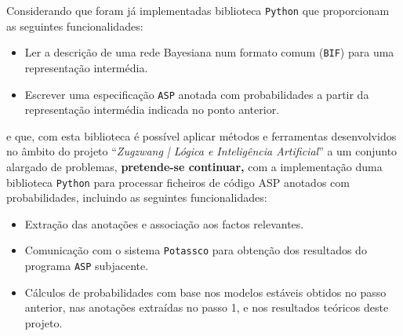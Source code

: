 \documentclass{oficio}
\begin{document}
\unidade{\textsc{\DI}}


Considerando que foram já implementadas biblioteca \texttt{Python} que proporcionam as seguintes funcionalidades:
%
\begin{itemize}
    \item Ler a descrição de uma rede Bayesiana num formato comum (\texttt{BIF}) para uma representação intermédia.
    \item Escrever uma especificação \texttt{ASP} anotada com probabilidades a partir da representação intermédia indicada no ponto anterior.
\end{itemize}
%
e que, com esta biblioteca é possível aplicar métodos e ferramentas desenvolvidos no âmbito do projeto ``\emph{Zugzwang | Lógica e Inteligência Artificial}'' a um conjunto alargado de problemas, \textbf{pretende-se continuar,} com a implementação duma biblioteca \texttt{Python} para processar ficheiros de código ASP anotados com probabilidades, incluindo as seguintes funcionalidades:

\begin{itemize}

    \item Extração das anotações e associação aos factos relevantes.
    \item Comunicação com o sistema \texttt{Potassco} para obtenção dos resultados do programa \texttt{ASP} subjacente.
    \item Cálculos de probabilidades com base nos modelos estáveis obtidos no passo anterior, nas anotações extraídas no passo 1, e nos resultados teóricos deste projeto.    
\end{itemize}

\end{document}
